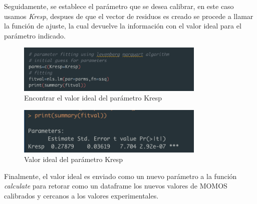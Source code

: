 Seguidamente, se establece el par\'ametro que se desea calibrar, en este caso usamos \textit{Kresp}, despues de que el vector de residuos es creado se procede a llamar la función de ajuste, la cual devuelve la información con el valor ideal para el par\'ametro indicado.

\begin{figure}[H]
  \centering
    \begin{minipage}{0.8\textwidth}
      \centering
      \includegraphics[width=0.8\textwidth]{figure_4_16.png}
      \caption{Encontrar el valor ideal del par\'ametro Kresp}
      \label{fig:Fig}
    \end{minipage}%
    \hspace{5mm}
\end{figure}

\begin{figure}[H]
  \centering
    \begin{minipage}{0.8\textwidth}
      \centering
      \includegraphics[width=0.8\textwidth]{figure_4_17.png}
      \caption{Valor ideal del par\'ametro Kresp}
      \label{fig:Fig}
    \end{minipage}%
    \hspace{5mm}
\end{figure}

Finalmente, el valor ideal es enviado como un nuevo par\'ametro a la funci\'on \textit{calculate} para retorar como un dataframe los nuevos valores de MOMOS calibrados y cercanos a los valores experimentales.

